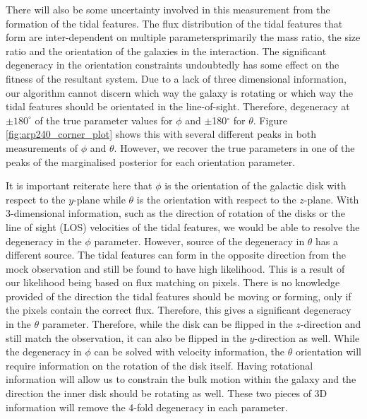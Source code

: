 There will also be some uncertainty involved in this measurement from the formation of the tidal features. The flux distribution of the tidal features that form are inter-dependent on multiple parameters\DIFdelbegin \DIFdel{; }\DIFdelend \DIFaddbegin \DIFadd{, }\DIFaddend primarily the mass ratio, the size ratio and the orientation of the galaxies in the interaction. The significant degeneracy in the orientation constraints undoubtedly has some effect on the fitness of the resultant system. Due to a lack of three dimensional information, our algorithm cannot discern which way the galaxy is rotating or which way the tidal features should be orientated in the line-of-sight. Therefore, degeneracy at $\pm180^{\circ}$ of the true parameter values for $\phi$ and $\pm$180$^{\circ}$ for $\theta$. Figure \ref{fig:arp240_corner_plot} shows this with several different peaks in both measurements of $\phi$ and $\theta$. However, we recover the true parameters in one of the peaks of the marginalised posterior for each orientation parameter.

It is important reiterate here that $\phi$ is the orientation of the galactic disk with respect to the $y$-plane while $\theta$ is the orientation with respect to the $z$-plane. With 3-dimensional information, such as the direction of rotation of the disks or the line of sight (LOS) velocities of the tidal features, we would be able to resolve the degeneracy in the $\phi$ parameter. However, \DIFdelbegin {}\DIFdelend \DIFaddbegin {}\DIFaddend source of the degeneracy in $\theta$ has a different source. The tidal features can form in the opposite direction from the mock observation and still be found to have high likelihood. This is a result of our likelihood being based on flux matching on pixels. There is no knowledge provided of the direction the tidal features should be moving or forming, only if the pixels contain the correct flux. Therefore, this gives a significant degeneracy in the $\theta$ parameter. Therefore, while the disk can be flipped in the $z$-direction and still match the observation, it can also be flipped in the $y$-direction as well. While the degeneracy in $\phi$ can be solved with velocity information, the $\theta$ orientation will require information on the rotation of the disk itself. Having rotational information will allow us to constrain the bulk motion within the galaxy and the direction the inner disk should be rotating as well. These two pieces of 3D information will remove the 4-fold degeneracy in each parameter.

